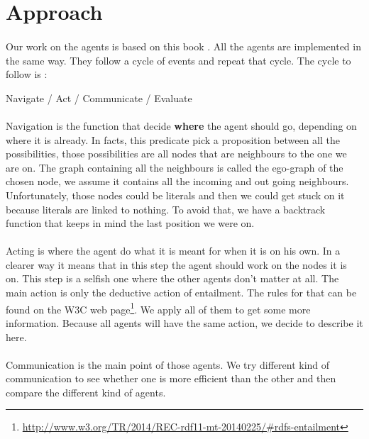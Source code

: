\documentclass{article}
\begin{document}
\newpage
\section{Approach}
	\paragraph{}
		Our work on the agents is based on this book \cite{Engelbrecht05}.
		All the agents are implemented in the same way.
		They follow a cycle of events and repeat that cycle.
		The cycle to follow is :
	\begin{center}
		Navigate / Act / Communicate / Evaluate
	\end{center}
	\paragraph{}
		Navigation is the function that decide \textbf{where} the agent should go, depending on where it is already.
		In facts, this predicate pick a proposition between all the possibilities,
		those possibilities are all nodes that are neighbours to the one we are on.
		The graph containing all the neighbours is called the ego-graph of the chosen node,
		we assume it contains all the incoming and out going neighbours.
		Unfortunately, those nodes could be literals and then we could get stuck on it because literals are linked to nothing.
		To avoid that, we have a backtrack function that keeps in mind the last position we were on.
	\paragraph{}
		Acting is where the agent do what it is meant for when it is on his own.
		In a clearer way it means that in this step the agent should work on the nodes it is on.
		This step is a selfish one where the other agents don't matter at all.
		The main action is only the deductive action of entailment.
		The rules for that can be found on the W3C web page\footnote{\url{http://www.w3.org/TR/2014/REC-rdf11-mt-20140225/\#rdfs-entailment}}.
		We apply all of them to get some more information.
		Because all agents will have the same action, we decide to describe it here.
	\paragraph{}
		Communication is the main point of those agents.
		We try different kind of communication to see whether one is more efficient than the other
		and then compare the different kind of agents.
\end{document}

